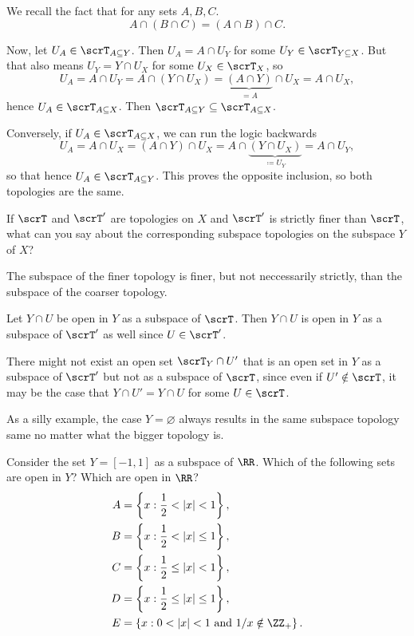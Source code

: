 \documentclass{article}
\begin{document}
We recall the fact that for any sets $A, B, C$.
\[
    A \cap (B \cap C) = (A \cap B) \cap C.
\]

Now, let $U_A \in \scrT_{A \subseteq Y}$.
Then $U_A = A \cap U_Y$ for some $U_Y \in \scrT_{Y \subseteq X}$.
But that also means $U_Y = Y \cap U_X$ for some $U_X \in \scrT_X$, so
\[
    U_A = A \cap U_Y = A \cap (Y \cap U_X) = \underbrace{(A \cap Y)}_{=A} \cap U_X = A \cap U_X,
\]
hence $U_A \in \scrT_{A \subseteq X}$.
Then $\scrT_{A \subseteq Y} \subseteq \scrT_{A \subseteq X}$.

Conversely, if $U_A \in \scrT_{A \subseteq X}$, we can run the logic backwards
\[
    U_A = A \cap U_X = (A \cap Y) \cap U_X = A \cap \underbrace{(Y \cap U_X)}_{\coloneq U_Y} = A \cap U_Y,
\]
so that hence $U_A \in \scrT_{A \subseteq Y}$.
This proves the opposite inclusion, so both topologies are the same.

\begin{exercise}
    If $\scrT$ and $\scrT'$ are topologies on $X$ and $\scrT'$ is strictly finer than $\scrT$, what can you say about the corresponding subspace topologies on the subspace $Y$ of $X$?
\end{exercise}

The subspace of the finer topology is finer, but not neccessarily strictly, than the subspace of the coarser topology.

Let $Y \cap U$ be open in $Y$ as a subspace of $\scrT$.
Then $Y \cap U$ is open in $Y$ as a subspace of $\scrT'$ as well since $U \in \scrT'$.

There might not exist an open set $\scrT_Y \cap U'$ that is an open set in $Y$ as a subspace of $\scrT'$ but not as a subspace of $\scrT$, since even if $U' \notin \scrT$, it may be the case that $Y \cap U' = Y \cap U$ for some $U \in \scrT$.

As a silly example, the case $Y = \varnothing$ always results in the same subspace topology same no matter what the bigger topology is.

\begin{exercise}
    Consider the set $Y = [-1,1]$ as a subspace of $\RR$.
    Which of the following sets are open in $Y$?
    Which are open in $\RR$?
    \begin{align*} 
        A &= \left\{x : \frac{1}{2} < |x| < 1 \right\}, \\
        B &= \left\{x : \frac{1}{2} < |x| \leq 1 \right\}, \\
        C &= \left\{x : \frac{1}{2} \leq |x| < 1 \right\}, \\
        D &= \left\{x : \frac{1}{2} \leq |x| \leq 1 \right\}, \\
        E &= \left\{x : 0 < |x| < 1 \text{ and } 1/x \notin \ZZ_+ \right\}.
    \end{align*}
\end{exercise}
\end{document}
